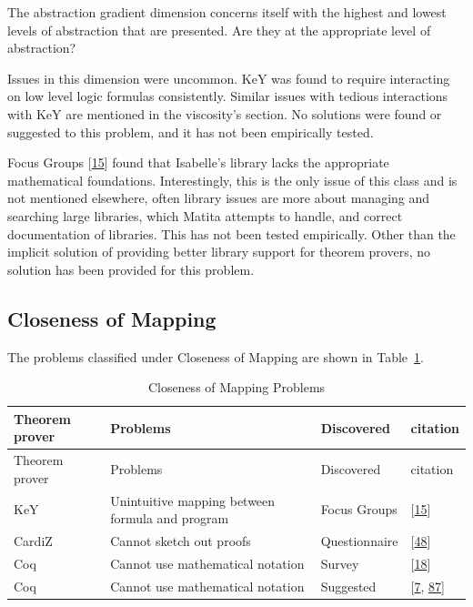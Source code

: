 \documentclass[
]{article}
\begin{document}
The abstraction gradient dimension concerns itself with the highest and
lowest levels of abstraction that are presented. Are they at the
appropriate level of abstraction?

Issues in this dimension were uncommon. KeY was found to require
interacting on low level logic formulas consistently. Similar issues
with tedious interactions with KeY are mentioned in the viscosity's
section. No solutions were found or suggested to this problem, and it
has not been empirically tested.

Focus Groups {[}\protect\hyperlink{ref-beckert_usability_2015}{15}{]}
found that Isabelle's library lacks the appropriate mathematical
foundations. Interestingly, this is the only issue of this class and is
not mentioned elsewhere, often library issues are more about managing
and searching large libraries, which Matita attempts to handle, and
correct documentation of libraries. This has not been tested
empirically. Other than the implicit solution of providing better
library support for theorem provers, no solution has been provided for
this problem.

\hypertarget{closeness-of-mapping}{%
\subsection{Closeness of Mapping}\label{closeness-of-mapping}}

The problems classified under Closeness of Mapping are shown in
Table~\ref{tbl:closeness_of_mapping}.

\hypertarget{tbl:closeness_of_mapping}{}
\begin{longtable}[]{@{}llll@{}}
\caption{\label{tbl:closeness_of_mapping}Closeness of Mapping
Problems}\tabularnewline
\toprule
Theorem prover & Problems & Discovered & citation \\
\midrule
\endfirsthead
\toprule
Theorem prover & Problems & Discovered & citation \\
\midrule
\endhead
KeY & Unintuitive mapping between formula and program & Focus Groups &
{[}\protect\hyperlink{ref-beckert_usability_2015}{15}{]} \\
CardiZ & Cannot sketch out proofs & Questionnaire &
{[}\protect\hyperlink{ref-kadoda_cognitive_2000}{48}{]} \\
Coq & Cannot use mathematical notation & Survey &
{[}\protect\hyperlink{ref-berman_development_2014}{18}{]} \\
Coq & Cannot use mathematical notation & Suggested &
{[}\protect\hyperlink{ref-asperti_user_2007}{7},
\protect\hyperlink{ref-zacchiroli_user_2007}{87}{]} \\
\bottomrule
\end{longtable}
\end{document}
